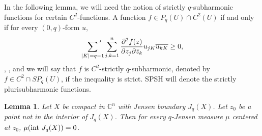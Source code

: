\documentclass[12pt]{amsart}
\newtheorem{lem}[theorem]{Lemma}
\numberwithin{equation}{section}
{\theoremstyle{definition}
\newtheorem{remark}[theorem]{Remark}
}
\begin{document}
In the following lemma, we will need the notion of strictly $q$-subharmonic functions for certain $C^2$-functions.  A function $f \in P_q(U) \cap C^2(U)$ if and only if for every $(0, q)$-form $u$,
\begin{equation}\label{q-subharmonic}
\sum_{|K| = q - 1}{\hspace{-8pt}{\vphantom{\sum}}'}\hspace{3pt} \sum_{j, k = 1}^n {\partial^2 f(z) \over \partial z_j \partial \bar{z}_k}u_{jK}\overline{u_{kK}} \geq 0,
\end{equation}
\cite[p.84, p.88]{St10}, \cite[p. 600]{AhDi09}, and we will say that $f$ is $C^2$-strictly $q$-subharmonic, denoted by $f \in C^{2} \cap SP_q(U)$, if the inequality is strict. SPSH will denote the strictly plurisubharmonic functions.
\begin{lem}\cite[Proposition 1.6]{Si87}\label{Proposition 1.6 of Sibony}
Let $X$ be compact in $\mathbb{C}^n$ with Jensen boundary $J_q(X)$.  Let $z_0$ be a point not in the interior of $J_q(X)$.  Then for every $q$-Jensen measure $\mu$ centered at $z_0$, $\mu(\hbox{int }J_q(X)) = 0$.
\end{lem}
\end{document}
